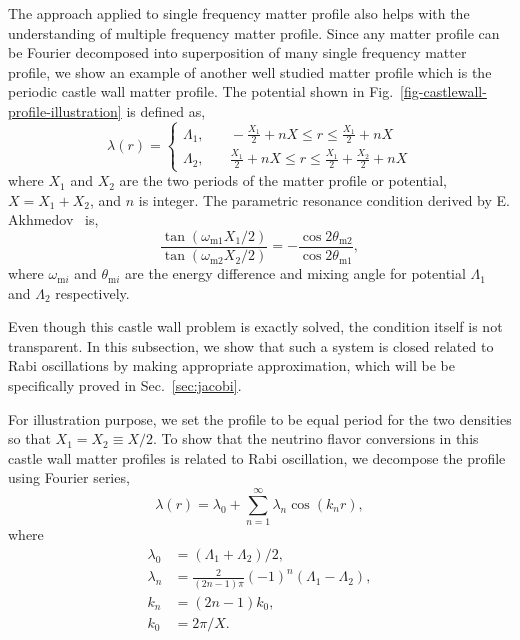 \documentclass[%
reprint,
 amsmath,amssymb,
 aps,
]{revtex4-1}
\begin{document}
The approach applied to single frequency matter profile also helps with the understanding of multiple frequency matter profile. Since any matter profile can be Fourier decomposed into superposition of many single frequency matter profile, we show an example of another well studied matter profile which is the periodic castle wall matter profile. The potential shown in Fig.~\ref{fig-castlewall-profile-illustration} is defined as,
\begin{equation}
    \lambda(r) = \begin{cases} 
\Lambda_1, &\quad -\frac{X_1}{2}+nX\le r\le \frac{X_1}{2}+nX \\
\Lambda_2, &\quad \frac{X_1}{2}+nX\le r\le \frac{X_1}{2}+\frac{X_2}{2} +nX
\end{cases}
\label{eq-castle-wall-potential}
\end{equation}
where $X_1$ and $X_2$ are the two periods of the matter profile or potential, $X=X_1+X_2$, and $n$ is integer. The parametric resonance condition derived by E. Akhmedov~\cite{Akhmedov2000} is,
\begin{equation}
    \frac{\tan (\omega_{\mathrm m1}X_1/2)}{\tan (\omega_{\mathrm m2}X_2/2)} = - \frac{\cos 2\theta_{\mathrm m2}}{\cos 2\theta_{\mathrm m1}},
\end{equation}
where $\omega_{\mathrm{m}i}$ and $\theta_{\mathrm{m}i}$ are the energy difference and mixing angle for potential $\Lambda_1$ and $\Lambda_2$ respectively.



Even though this castle wall problem is exactly solved, the condition itself is not transparent. In this subsection, we show that such a system is closed related to Rabi oscillations by making appropriate approximation, which will be be specifically proved in Sec.~\ref{sec:jacobi}.

For illustration purpose, we set the profile to be equal period for the two densities so that $X_1=X_2\equiv X/2$. To show that the neutrino flavor conversions in this castle wall matter profiles is related to Rabi oscillation, we decompose the profile using Fourier series,
\begin{equation}
\lambda(r) = \lambda_0 + \sum_{n=1}^{\infty} \lambda_n \cos\left( k_n  r \right),
\label{eq-castle-wall-fourier-expanded}
\end{equation}
where 
\begin{align*}
\lambda_0 &= (\Lambda_1 + \Lambda_2)/2, \\
\lambda_n & = \frac{2}{(2n-1)\pi}  (-1)^n  \left( \Lambda_1 -  \Lambda_2 \right),\\
k_n &= (2n-1)k_0, \\
k_0 &= 2\pi/X.
\end{align*}
\end{document}
